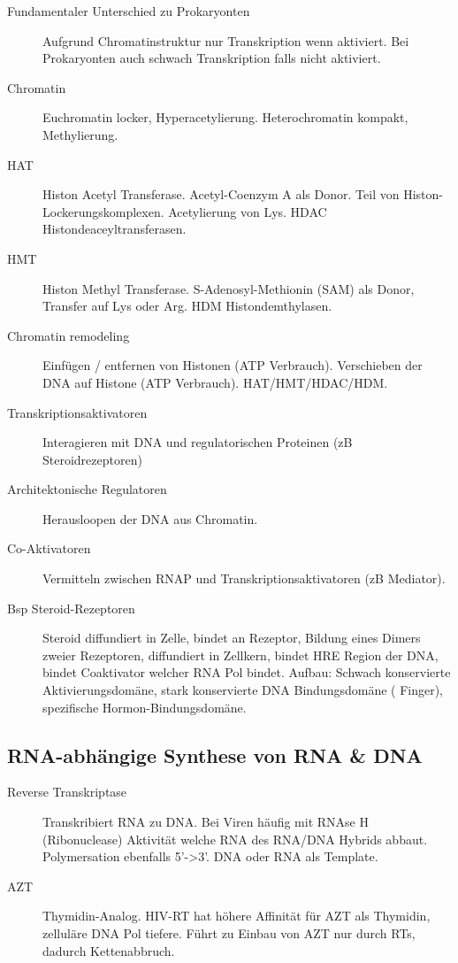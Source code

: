 \documentclass[a4paper,twocolumn,usegeometry,english,fontsize=5,DIV=28]{scrartcl}
\begin{document}
\begin{description}
	\item[Fundamentaler Unterschied zu Prokaryonten] Aufgrund
		Chromatinstruktur nur Transkription wenn aktiviert. Bei
		Prokaryonten auch schwach Transkription falls nicht aktiviert.
	\item[Chromatin] Euchromatin locker, Hyperacetylierung. Heterochromatin
		kompakt, Methylierung.
	\item[HAT] Histon Acetyl Transferase. Acetyl-Coenzym A als Donor. Teil
		von Histon-Lockerungskomplexen. Acetylierung von Lys. HDAC
		Histondeaceyltransferasen.
	\item[HMT] Histon Methyl Transferase. S-Adenosyl-Methionin (SAM) als
		Donor, Transfer auf Lys oder Arg. HDM Histondemthylasen.
	\item[Chromatin remodeling] Einfügen / entfernen von Histonen (ATP
		Verbrauch). Verschieben der DNA auf Histone (ATP Verbrauch).
		HAT/HMT/HDAC/HDM.
	\item[Transkriptionsaktivatoren] Interagieren mit DNA und
		regulatorischen Proteinen (zB Steroidrezeptoren)
	\item[Architektonische Regulatoren] Herausloopen der DNA aus Chromatin.
	\item[Co-Aktivatoren] Vermitteln zwischen RNAP und
		Transkriptionsaktivatoren (zB Mediator).
	\item[Bsp Steroid-Rezeptoren] Steroid diffundiert in Zelle, bindet an
		Rezeptor, Bildung eines Dimers zweier Rezeptoren, diffundiert
		in Zellkern, bindet HRE Region der DNA, bindet Coaktivator
		welcher RNA Pol bindet.  Aufbau: Schwach konservierte
		Aktivierungsdomäne, stark konservierte DNA Bindungsdomäne
		( Finger), spezifische Hormon-Bindungsdomäne.
\end{description}

\subsection{RNA-abhängige Synthese von RNA \& DNA}

\begin{description}
	\item[Reverse Transkriptase] Transkribiert RNA zu DNA. Bei Viren häufig
		mit RNAse H (Ribonuclease) Aktivität welche RNA des RNA/DNA
		Hybrids abbaut. Polymersation ebenfalls 5'->3'. DNA oder RNA
		als Template.
	\item[AZT] Thymidin-Analog. HIV-RT hat höhere Affinität für AZT als
		Thymidin, zelluläre DNA Pol tiefere. Führt zu Einbau von AZT
		nur durch RTs, dadurch Kettenabbruch.
\end{description}
\end{document}
